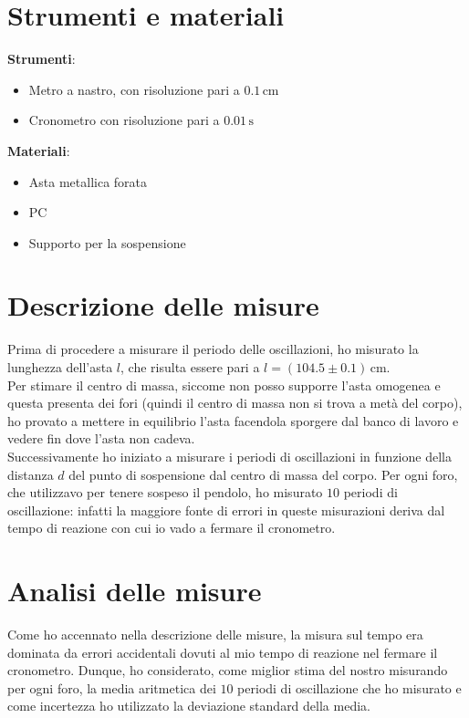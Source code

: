 \documentclass{article}
\begin{document}
\section{Strumenti e materiali}
	\textbf{Strumenti}:	
	\begin{itemize}
		\item Metro a nastro, con risoluzione pari a $0.1 \, \si{\centi\meter}$
		\item Cronometro con risoluzione pari a $0.01 \, \si{\second}$
	\end{itemize}
	\textbf{Materiali}:
	\begin{itemize}
		\item Asta metallica forata
		\item PC
		\item Supporto per la sospensione
	\end{itemize}

\section{Descrizione delle misure}
Prima di procedere a misurare il periodo delle oscillazioni, ho misurato la lunghezza dell'asta $l$, che risulta essere pari a $l = (104.5 \pm 0.1) \, \si{\centi\meter}$. \\
Per stimare il centro di massa, siccome non posso supporre l'asta omogenea e questa presenta dei fori (quindi il centro di massa non si trova a metà del corpo), ho provato a mettere in equilibrio l'asta facendola sporgere dal banco di lavoro e vedere fin dove l'asta non cadeva. \\
Successivamente ho iniziato a misurare i periodi di oscillazioni in funzione della distanza $d$ del punto di sospensione dal centro di massa del corpo. Per ogni foro, che utilizzavo per tenere sospeso il pendolo, ho misurato $10$ periodi di oscillazione: infatti la maggiore fonte di errori in queste misurazioni deriva dal tempo di reazione con cui io vado a fermare il cronometro. \\

\pagebreak

\section{Analisi delle misure}
Come ho accennato nella descrizione delle misure, la misura sul tempo era dominata da errori accidentali dovuti al mio tempo di reazione nel fermare il cronometro. Dunque, ho considerato, come miglior stima del nostro misurando per ogni foro, la media aritmetica dei $10$ periodi di oscillazione che ho misurato e come incertezza ho utilizzato la deviazione standard della media. \\
\end{document}
